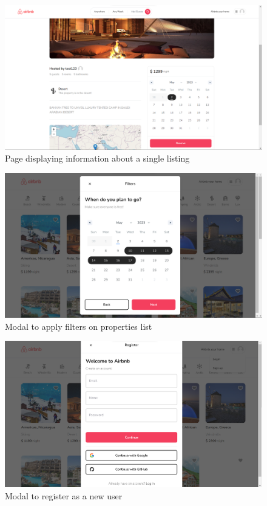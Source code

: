 \begin{figure}[!h]
	\centering
	\includegraphics[scale=0.3]{chapters/images/listing-page.png}
	\caption{Page displaying information about a single listing}
\end{figure}

\begin{figure}[!h]
	\centering
	\includegraphics[scale=0.3]{chapters/images/filters-modal.png}
	\caption{Modal to apply filters on properties list}
\end{figure}

\begin{figure}[!h]
	\centering
	\includegraphics[scale=0.3]{chapters/images/registration-modal.png}
	\caption{Modal to register as a new user}
\end{figure}

